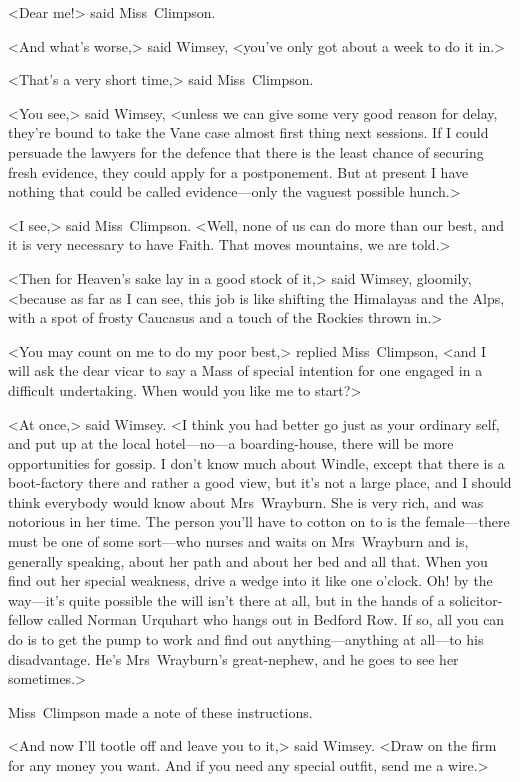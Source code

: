<Dear me!> said Miss~Climpson.

<And what's worse,> said Wimsey, <you've only got about a week to do it in.>

<That's a very short time,> said Miss~Climpson.

<You see,> said Wimsey, <unless we can give some very good reason for delay, they're bound to take the Vane case almost first thing next sessions. If I could persuade the lawyers for the defence that there is the least chance of securing fresh evidence, they could apply for a postponement. But at present I have nothing that could be called evidence—only the vaguest possible hunch.>

<I see,> said Miss~Climpson. <Well, none of us can do more than our best, and it is very necessary to have Faith. That moves mountains, we are told.>

<Then for Heaven's sake lay in a good stock of it,> said Wimsey, gloomily, <because as far as I can see, this job is like shifting the Himalayas and the Alps, with a spot of frosty Caucasus and a touch of the Rockies thrown in.>

<You may count on me to do my poor best,> replied Miss~Climpson, <and I will ask the dear vicar to say a Mass of special intention for one engaged in a difficult undertaking. When would you like me to start?>

<At once,> said Wimsey. <I think you had better go just as your ordinary self, and put up at the local hotel—no—a boarding-house, there will be more opportunities for gossip. I don't know much about Windle, except that there is a boot-factory there and rather a good view, but it's not a large place, and I should think everybody would know about Mrs~Wrayburn. She is very rich, and was notorious in her time. The person you'll have to cotton on to is the female—there must be one of some sort—who nurses and waits on Mrs~Wrayburn and is, generally speaking, about her path and about her bed and all that. When you find out her special weakness, drive a wedge into it like one o'clock. Oh! by the way—it's quite possible the will isn't there at all, but in the hands of a solicitor-fellow called Norman Urquhart who hangs out in Bedford Row. If so, all you can do is to get the pump to work and find out anything—anything at all—to his disadvantage. He's Mrs~Wrayburn's great-nephew, and he goes to see her sometimes.>

Miss~Climpson made a note of these instructions.

<And now I'll tootle off and leave you to it,> said Wimsey. <Draw on the firm for any money you want. And if you need any special outfit, send me a wire.>

